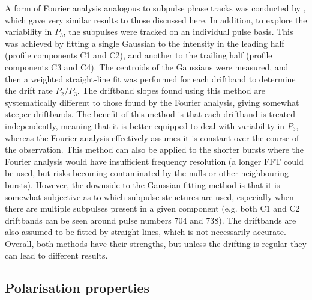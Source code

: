 A form of Fourier analysis analogous to subpulse phase tracks was conducted by \citet{ZLH+2019}, which gave very similar results to those discussed here. In addition, to explore the variability in $P_3$, the subpulses were tracked on an individual pulse basis. This was achieved by fitting a single Gaussian to the intensity in the leading half (profile components C1 and C2), and another to the trailing half (profile components C3 and C4). The centroids of the Gaussians were measured, and then a weighted straight-line fit was performed for each driftband to determine the drift rate $P_2/P_3$. The driftband slopes found using this method are systematically different to those found by the Fourier analysis, giving somewhat steeper driftbands. The benefit of this method is that each driftband is treated independently, meaning that it is better equipped to deal with variability in $P_3$, whereas the Fourier analysis effectively assumes it is constant over the course of the observation. This method can also be applied to the shorter bursts where the Fourier analysis would have insufficient frequency resolution (a longer FFT could be used, but risks becoming contaminated by the nulls or other neighbouring bursts). However, the downside to the Gaussian fitting method is that it is somewhat subjective as to which subpulse structures are used, especially when there are multiple subpulses present in a given component (e.g. both C1 and C2 driftbands can be seen around pulse numbers 704 and 738). The driftbands are also assumed to be fitted by straight lines, which is not necessarily accurate. Overall, both methods have their strengths, but unless the drifting is regular they can lead to different results.











\subsection{Polarisation properties}
\label{sec: J1926 - analysis - polarisation}

